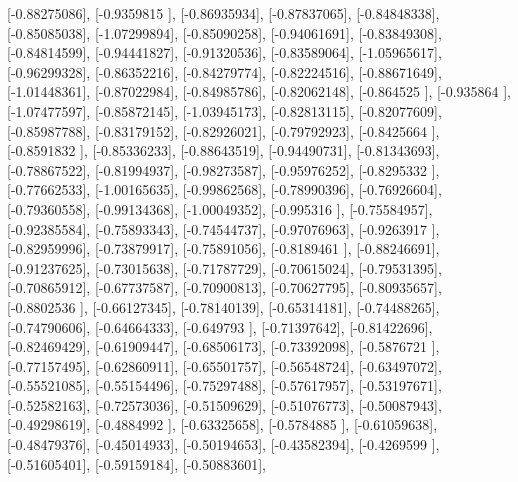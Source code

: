 \documentclass{article}
\begin{document}
       [-0.88275086],
       [-0.9359815 ],
       [-0.86935934],
       [-0.87837065],
       [-0.84848338],
       [-0.85085038],
       [-1.07299894],
       [-0.85090258],
       [-0.94061691],
       [-0.83849308],
       [-0.84814599],
       [-0.94441827],
       [-0.91320536],
       [-0.83589064],
       [-1.05965617],
       [-0.96299328],
       [-0.86352216],
       [-0.84279774],
       [-0.82224516],
       [-0.88671649],
       [-1.01448361],
       [-0.87022984],
       [-0.84985786],
       [-0.82062148],
       [-0.864525  ],
       [-0.935864  ],
       [-1.07477597],
       [-0.85872145],
       [-1.03945173],
       [-0.82813115],
       [-0.82077609],
       [-0.85987788],
       [-0.83179152],
       [-0.82926021],
       [-0.79792923],
       [-0.8425664 ],
       [-0.8591832 ],
       [-0.85336233],
       [-0.88643519],
       [-0.94490731],
       [-0.81343693],
       [-0.78867522],
       [-0.81994937],
       [-0.98273587],
       [-0.95976252],
       [-0.8295332 ],
       [-0.77662533],
       [-1.00165635],
       [-0.99862568],
       [-0.78990396],
       [-0.76926604],
       [-0.79360558],
       [-0.99134368],
       [-1.00049352],
       [-0.995316  ],
       [-0.75584957],
       [-0.92385584],
       [-0.75893343],
       [-0.74544737],
       [-0.97076963],
       [-0.9263917 ],
       [-0.82959996],
       [-0.73879917],
       [-0.75891056],
       [-0.8189461 ],
       [-0.88246691],
       [-0.91237625],
       [-0.73015638],
       [-0.71787729],
       [-0.70615024],
       [-0.79531395],
       [-0.70865912],
       [-0.67737587],
       [-0.70900813],
       [-0.70627795],
       [-0.80935657],
       [-0.8802536 ],
       [-0.66127345],
       [-0.78140139],
       [-0.65314181],
       [-0.74488265],
       [-0.74790606],
       [-0.64664333],
       [-0.649793  ],
       [-0.71397642],
       [-0.81422696],
       [-0.82469429],
       [-0.61909447],
       [-0.68506173],
       [-0.73392098],
       [-0.5876721 ],
       [-0.77157495],
       [-0.62860911],
       [-0.65501757],
       [-0.56548724],
       [-0.63497072],
       [-0.55521085],
       [-0.55154496],
       [-0.75297488],
       [-0.57617957],
       [-0.53197671],
       [-0.52582163],
       [-0.72573036],
       [-0.51509629],
       [-0.51076773],
       [-0.50087943],
       [-0.49298619],
       [-0.4884992 ],
       [-0.63325658],
       [-0.5784885 ],
       [-0.61059638],
       [-0.48479376],
       [-0.45014933],
       [-0.50194653],
       [-0.43582394],
       [-0.4269599 ],
       [-0.51605401],
       [-0.59159184],
       [-0.50883601],
\end{document}
